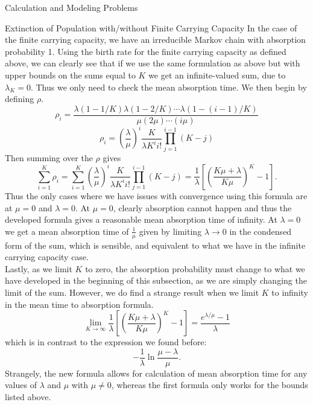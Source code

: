 \documentclass[12pt]{article}
\numberwithin{equation}{section}
\begin{document}
\begin{section}{Calculation and Modeling Problems}
\begin{subsection}{Extinction of Population with/without Finite Carrying Capacity}
    In the case of the finite carrying capacity, we have an irreducible Markov chain with absorption probability 1. Using the birth rate for the finite carrying capacity as defined above, we can clearly see that if we use the same formulation as above but with upper bounds on the sums equal to $K$ we get an infinite-valued sum, due to $\lambda_K=0$. Thus we only need to check the mean absorption time. We then begin by defining $\rho$.
    $$\rho_i=\frac{\lambda(1-1/K)\lambda(1-2/K)\cdots\lambda(1-(i-1)/K)}{\mu(2\mu)\cdots(i\mu)}$$
    $$\rho_i=\left(\frac{\lambda}{\mu}\right)^i\frac{K}{\lambda K^{i} i!}\prod_{j=1}^{i-1}(K-j)$$
    Then summing over the $\rho$ gives
    $$\sum_{i=1}^K\rho_i=\sum_{i=1}^K\left(\frac{\lambda}{\mu}\right)^i\frac{K}{\lambda K^{i} i!}\prod_{j=1}^{i-1}(K-j)=\frac{1}{\lambda}\left[\left(\frac{K\mu+\lambda}{K\mu}\right)^K-1\right].$$
    Thus the only cases where we have issues with convergence using this formula are at $\mu=0$ and $\lambda=0$. At $\mu=0$, clearly absorption cannot happen and thus the developed formula gives a reasonable mean absorption time of infinity. At $\lambda=0$ we get a mean absorption time of $\frac{1}{\mu}$ given by limiting $\lambda\to 0$ in the condensed form of the sum, which is sensible, and equivalent to what we have in the infinite carrying capacity case.\\

    Lastly, as we limit $K$ to zero, the absorption probability must change to what we have developed in the beginning of this subsection, as we are simply changing the limit of the sum. However, we do find a strange result when we limit $K$ to infinity in the mean time to absorption formula.
    $$\lim_{K\to\infty}\frac{1}{\lambda}\left[\left(\frac{K\mu+\lambda}{K\mu}\right)^K-1\right]=\frac{e^{\lambda/\mu}-1}{\lambda}$$
    which is in contrast to the expression we found before:
    $$-\frac{1}{\lambda}\ln{\frac{\mu-\lambda}{\mu}}.$$
    Strangely, the new formula allows for calculation of mean absorption time for any values of $\lambda$ and $\mu$ with $\mu\neq 0$, whereas the first formula only works for the bounds listed above.


\end{subsection}
\end{section}
\end{document}
